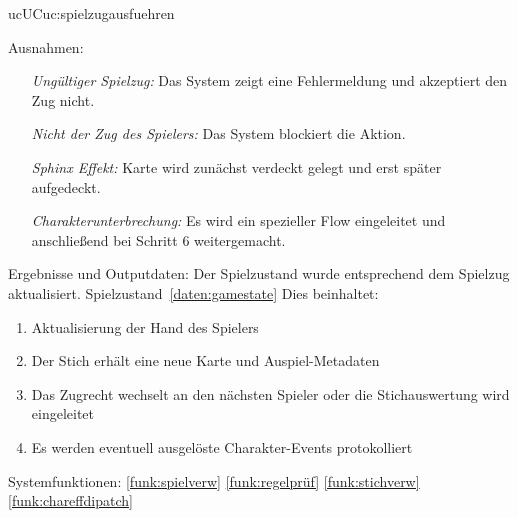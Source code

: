 \begin{description}[leftmargin=5em, style=sameline]
\begin{lhp}{uc}{UC}{uc:spielzugausfuehren}
\begin{enumerate}
\begin{enumerate}
                \end{enumerate}
        \end{enumerate} 
    \item [Ausnahmen:] \hfill
        \begin{itemize}
            \item[] \textit{Ungültiger Spielzug:} Das System zeigt eine Fehlermeldung und akzeptiert den Zug nicht.
            \item[] \textit{Nicht der Zug des Spielers:} Das System blockiert die Aktion.
            \item[] \textit{Sphinx Effekt:} Karte wird zunächst verdeckt gelegt und erst später aufgedeckt.
            \item[] \textit{Charakterunterbrechung:} Es wird ein spezieller Flow eingeleitet und anschließend bei Schritt 6 weitergemacht.
        \end{itemize}
    \item [Ergebnisse und Outputdaten:] Der Spielzustand wurde entsprechend dem Spielzug aktualisiert. Spielzustand~\ref{daten:gamestate}
    \newline Dies beinhaltet:
    \begin{enumerate}
        \item Aktualisierung der Hand des Spielers
        \item Der Stich erhält eine neue Karte und Auspiel-Metadaten
        \item Das Zugrecht wechselt an den nächsten Spieler oder die Stichauswertung wird eingeleitet
        \item Es werden eventuell ausgelöste Charakter-Events protokolliert
    \end{enumerate}
    \item [Systemfunktionen:] \ref{funk:spielverw} \ref{funk:regelprüf} \ref{funk:stichverw} \ref{funk:chareffdipatch}
    \end{lhp}


\end{description}
